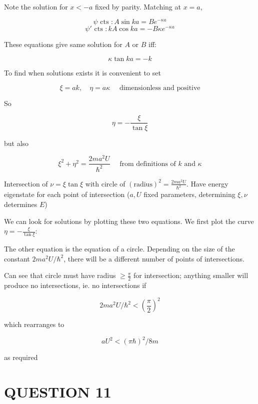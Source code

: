 \documentclass[a4paper]{article}
\begin{document}
Note the solution for $ x < -a $ fixed by parity. Matching at $ x = a $,

\[ \psi \text{ cts }: A \sin k a = B e^{-\kappa a} \]
\[ \psi' \text{ cts }: k A \cos k a = - B \kappa e^{-\kappa a} \]

These equations give same solution for $ A $ or $ B $ iff:

\[ \kappa \tan k a = - k  \]


To find when solutions exists it is convenient to set

\[ \xi = a k, \quad \eta = a \kappa \quad \text{ dimensionless and positive} \]

So 

\[ \eta = - \frac{\xi}{\tan \xi} \]

but also 

\[ \xi^{2} +\eta^{2}= \frac{2ma^{2}U}{\hbar^{2}} \quad \text{ from definitions of } k \text{ and } \kappa \]

Intersection of $ \nu = \xi \tan \xi $ with circle of $ (\text{radius})^{2} = \frac{2ma^{2} U}{\hbar^{2}} $. Have energy eigenstate for each point of intersection ($ a,U $ fixed parameters, determining $ \xi,\nu $ determines $ E $)

We can look for solutions by plotting these two equations. We first plot the curve $\eta =  - \frac{\xi}{\tan \xi}$:

\begin{center}
\end{center}

The other equation is the equation of a circle. Depending on the size of the constant $2ma^2 U/\hbar^2$, there will be a different number of points of intersections.

Can see that circle must have radius $ \geq \frac{\pi}{2} $ for intersection; anything smaller will produce no intersections, ie. no intersections if

\[ 2ma^2 U/\hbar^2 < \left( \frac{\pi}{2}\right)^{2} \]

which rearranges to

\[  a U^{2}  < (\pi \hbar)^{2} / 8m \]

as required


\section{QUESTION 11}                                  
\end{document}
